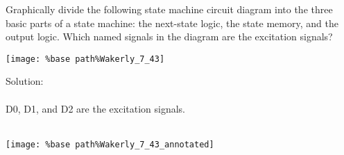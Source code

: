 Graphically divide the following state machine circuit diagram into the three basic parts of a state machine: the next-state logic, the state memory, and the output logic.  Which named signals in the diagram are the excitation signals?
\begin{center}
  \texttt{[image: \%base path\%Wakerly\_7\_43]}
\end{center}

Solution: \\ \\
D0, D1, and D2 are the excitation signals.\\ \\
\begin{center}
  \texttt{[image: \%base path\%Wakerly\_7\_43\_annotated]}
\end{center}
